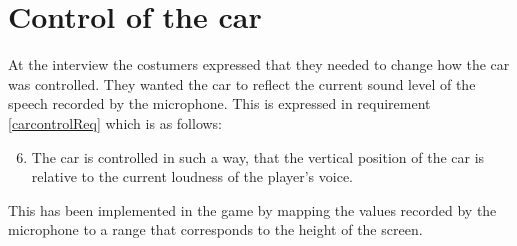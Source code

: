 \section{Control of the car}
At the interview the costumers expressed that they needed to change how the car was controlled.
They wanted the car to reflect the current sound level of the speech recorded by the microphone.
This is expressed in requirement \ref{carcontrolReq} which is as follows:
\begin{enumerate}
\setcounter{enumi}{5}
\item The car is controlled in such a way, that the vertical position of the car is relative to the current loudness of the player's voice.
\end{enumerate}

This has been implemented in the game by mapping the values recorded by the microphone to a range that corresponds to the height of the screen.

